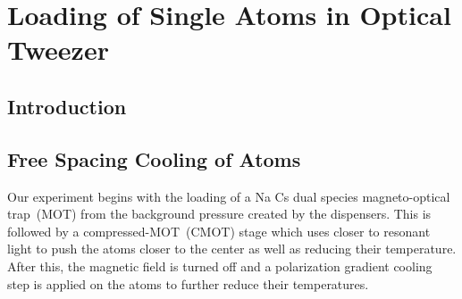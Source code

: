 
\chapter{Loading of Single Atoms in Optical Tweezer}
\label{ch:loading}

\section{Introduction}
\label{ch:loading:introduction}


\section{Free Spacing Cooling of Atoms}
\label{ch:loading:free-space}

Our experiment begins with the loading of a Na Cs dual species magneto-optical trap~(MOT)
from the background pressure created by the dispensers.
This is followed by a compressed-MOT~(CMOT) stage
which uses closer to resonant light to push the atoms closer to the center
as well as reducing their temperature.
After this, the magnetic field is turned off and
a polarization gradient cooling step is applied on the atoms
to further reduce their temperatures.


